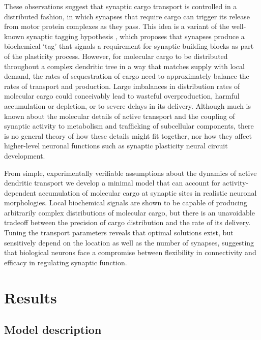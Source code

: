 \documentclass[10pt]{wlpeerj}
\begin{document}
These observations suggest that synaptic cargo transport is controlled in a distributed fashion, in which synapses that require cargo can trigger its release from motor protein complexes as they pass.
This idea is a variant of the well-known synaptic tagging hypothesis \citep{Frey_1997}, which proposes that synapses produce a biochemical `tag' that signals a requirement for synaptic building blocks as part of the plasticity process.
However, for molecular cargo to be distributed throughout a complex dendritic tree in a way that matches supply with local demand, the rates of sequestration of cargo need to approximately balance the rates of transport and production.
Large imbalances in distribution rates of molecular cargo could conceivably lead to wasteful overproduction, harmful accumulation or depletion, or to severe delays in its delivery. 
Although much is known about the molecular details of active transport and the coupling of synaptic activity to metabolism and trafficking of subcellular components, there is no general theory of how these details might fit together, nor how they affect higher-level neuronal functions such as synaptic plasticity neural circuit development.

From simple, experimentally verifiable assumptions about the dynamics of active dendritic transport we develop a minimal model that can account for activity-dependent accumulation of molecular cargo at synaptic sites in realistic neuronal morphologies.
Local biochemical signals are shown to be capable of producing arbitrarily complex distributions of molecular cargo, but there is an unavoidable tradeoff between the precision of cargo distribution and the rate of its delivery.
Tuning the transport parameters reveals that optimal solutions exist, but sensitively depend on the location as well as the number of synapses, suggesting that biological neurons face a compromise between flexibility in connectivity and efficacy in regulating synaptic function.

\hl{}

\section*{Results}

\subsection*{Model description}
\end{document}
